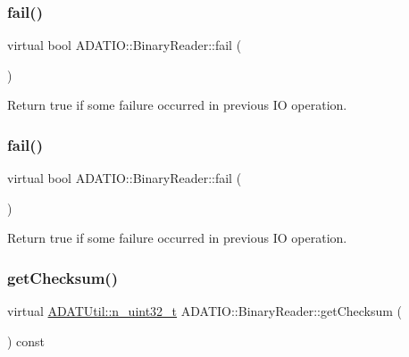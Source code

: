 \subsubsection{\texorpdfstring{fail()}{fail()}\hspace{0.1cm}{\footnotesize\ttfamily [2/3]}}
{\footnotesize\ttfamily virtual bool A\+D\+A\+T\+I\+O\+::\+Binary\+Reader\+::fail (\begin{DoxyParamCaption}{ }\end{DoxyParamCaption})\hspace{0.3cm}{\ttfamily [virtual]}}



Return true if some failure occurred in previous IO operation. 

\mbox{\label{classADATIO_1_1BinaryReader_a4db0ebc0b7edd371bf0daa98e3bc696b}} 
\subsubsection{\texorpdfstring{fail()}{fail()}\hspace{0.1cm}{\footnotesize\ttfamily [3/3]}}
{\footnotesize\ttfamily virtual bool A\+D\+A\+T\+I\+O\+::\+Binary\+Reader\+::fail (\begin{DoxyParamCaption}{ }\end{DoxyParamCaption})\hspace{0.3cm}{\ttfamily [virtual]}}



Return true if some failure occurred in previous IO operation. 

\mbox{\label{classADATIO_1_1BinaryReader_acd705bb96d557a5437410b55beb40bda}} 
\subsubsection{\texorpdfstring{getChecksum()}{getChecksum()}\hspace{0.1cm}{\footnotesize\ttfamily [1/3]}}
{\footnotesize\ttfamily virtual \mbox{\hyperlink{namespaceADATUtil_ad945a8afa4db2d1f89b731964adae97e}{A\+D\+A\+T\+Util\+::n\+\_\+uint32\+\_\+t}} A\+D\+A\+T\+I\+O\+::\+Binary\+Reader\+::get\+Checksum (\begin{DoxyParamCaption}{ }\end{DoxyParamCaption}) const\hspace{0.3cm}{\ttfamily [pure virtual]}}



